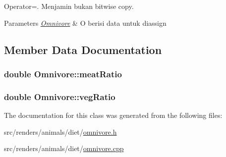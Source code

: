 Operator=. Menjamin bukan bitwise copy. 


\begin{DoxyParams}{Parameters}
{\em \hyperlink{classOmnivore}{Omnivore}} & O berisi data untuk diassign \\
\hline
\end{DoxyParams}


\subsection{Member Data Documentation}
\subsubsection[{\texorpdfstring{meat\+Ratio}{meatRatio}}]{\setlength{\rightskip}{0pt plus 5cm}double Omnivore\+::meat\+Ratio\hspace{0.3cm}{\ttfamily [protected]}}\hypertarget{classOmnivore_a41e3629de95c2055f5719d11b6af960d}{}\label{classOmnivore_a41e3629de95c2055f5719d11b6af960d}
\subsubsection[{\texorpdfstring{veg\+Ratio}{vegRatio}}]{\setlength{\rightskip}{0pt plus 5cm}double Omnivore\+::veg\+Ratio\hspace{0.3cm}{\ttfamily [protected]}}\hypertarget{classOmnivore_af6acd414d9a4736ab647c72ccc9c1c87}{}\label{classOmnivore_af6acd414d9a4736ab647c72ccc9c1c87}


The documentation for this class was generated from the following files\+:\begin{DoxyCompactItemize}
\item 
src/renders/animals/diet/\hyperlink{omnivore_8h}{omnivore.\+h}\item 
src/renders/animals/diet/\hyperlink{omnivore_8cpp}{omnivore.\+cpp}\end{DoxyCompactItemize}
